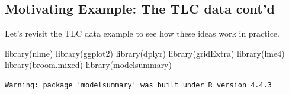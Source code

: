 \documentclass[
  letterpaper,
  DIV=11,
  numbers=noendperiod]{scrreprt}
\newenvironment{Shaded}{\begin{snugshade}}{\end{snugshade}}
\newcommand{\FunctionTok}[1]{\textcolor[rgb]{0.28,0.35,0.67}{#1}}
\newcommand{\NormalTok}[1]{\textcolor[rgb]{0.00,0.23,0.31}{#1}}
\begin{document}
\hypertarget{motivating-example-the-tlc-data-contd}{%
\subsection*{Motivating Example: The TLC data
cont'd}\label{motivating-example-the-tlc-data-contd}}

Let's revisit the TLC data example to see how these ideas work in
practice.

\begin{Shaded}
\begin{Highlighting}[]
\FunctionTok{library}\NormalTok{(nlme) }
\FunctionTok{library}\NormalTok{(ggplot2)}
\FunctionTok{library}\NormalTok{(dplyr)}
\FunctionTok{library}\NormalTok{(gridExtra) }
\FunctionTok{library}\NormalTok{(lme4)}
\FunctionTok{library}\NormalTok{(broom.mixed)}
\FunctionTok{library}\NormalTok{(modelsummary)}
\end{Highlighting}
\end{Shaded}

\begin{verbatim}
Warning: package 'modelsummary' was built under R version 4.4.3
\end{verbatim}
\end{document}
